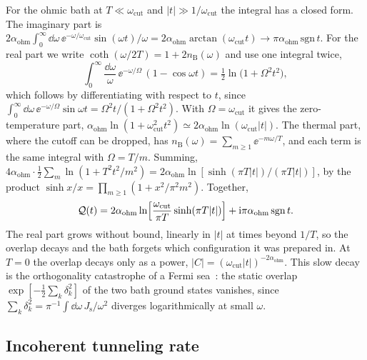 For the ohmic bath at $T \ll \omega_{\mathrm{cut}}$ and $|t| \gg 1/\omega_{\mathrm{cut}}$ the integral has a closed form. The imaginary part is $2\alpha_{\mathrm{ohm}}\int_0^\infty\dd\omega\,\ee^{-\omega/\omega_{\mathrm{cut}}}\sin(\omega t)/\omega = 2\alpha_{\mathrm{ohm}}\arctan(\omega_{\mathrm{cut}}t) \to \pi\alpha_{\mathrm{ohm}}\,\mathrm{sgn}\,t$. For the real part we write $\coth(\omega/2T) = 1 + 2n_{\mathrm{B}}(\omega)$ and use one integral twice,
\begin{equation*}
  \int_0^\infty\frac{\dd\omega}{\omega}\,\ee^{-\omega/\Omega}\,(1 - \cos\omega t) = \tfrac12\ln\bigl(1 + \Omega^2t^2\bigr),
\end{equation*}
which follows by differentiating with respect to $t$, since $\int_0^\infty\dd\omega\,\ee^{-\omega/\Omega}\sin\omega t = \Omega^2t/(1 + \Omega^2t^2)$. With $\Omega = \omega_{\mathrm{cut}}$ it gives the zero-temperature part, $\alpha_{\mathrm{ohm}}\ln(1 + \omega_{\mathrm{cut}}^2t^2) \simeq 2\alpha_{\mathrm{ohm}}\ln(\omega_{\mathrm{cut}}|t|)$. The thermal part, where the cutoff can be dropped, has $n_{\mathrm{B}}(\omega) = \sum_{m\ge1}\ee^{-m\omega/T}$, and each term is the same integral with $\Omega = T/m$. Summing, $4\alpha_{\mathrm{ohm}}\cdot\tfrac12\sum_m\ln(1 + T^2t^2/m^2) = 2\alpha_{\mathrm{ohm}}\ln[\sinh(\pi T|t|)/(\pi T|t|)]$, by the product $\sinh x/x = \prod_{m\ge1}(1 + x^2/\pi^2m^2)$. Together,
\begin{equation}
  \mathcal{Q}(t) = 2\alpha_{\mathrm{ohm}}\ln\Bigl[\frac{\omega_{\mathrm{cut}}}{\pi T}\sinh(\pi T|t|)\Bigr] + \mathrm{i}\pi\alpha_{\mathrm{ohm}}\,\mathrm{sgn}\,t .
  \label{eq:C.20-Qohm}
\end{equation}
The real part grows without bound, linearly in $|t|$ at times beyond $1/T$, so the overlap decays and the bath forgets which configuration it was prepared in. At $T = 0$ the overlap decays only as a power, $|C| = (\omega_{\mathrm{cut}}|t|)^{-2\alpha_{\mathrm{ohm}}}$. This slow decay is the orthogonality catastrophe of a Fermi sea~\cite{leggett1987dynamics}: the static overlap $\exp[-\tfrac12\sum_k\delta_k^2]$ of the two bath ground states vanishes, since $\sum_k\delta_k^2 = \pi^{-1}\int\dd\omega\,J_{\mathrm{s}}/\omega^2$ diverges logarithmically at small $\omega$.

\subsection{Incoherent tunneling rate}

